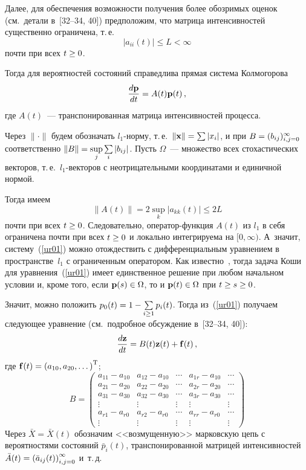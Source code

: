 \begin{multicols}{2}
Далее, для обеспечения возможности получения более обозримых оценок
(см.\ детали в~[32--34, 40]) предположим, что матрица интенсивностей
существенно ограничена, т.\,е.\
\begin{equation}
|a_{ii}(t)| \le L < \infty
\label{0102-1}
\end{equation}
\noindent почти при всех $t \hm\ge 0$.


Тогда для вероятностей состояний справедлива прямая система Колмогорова
\begin{equation} \label{ur01}
\displaystyle\frac{\displaystyle d{\mathbf p}\mathstrut}{\displaystyle dt\mathstrut}=A(t){\mathbf p}(t)\,,
\end{equation}
\noindent где $A(t)$~--- транспонированная матрица интенсивностей процесса.

Через $\|\cdot\|$  будем обозначать  $l_1$-нор\-му, т.\,е.\  $\|{\vx}\|\hm=\sum|x_i|$, и при
$B \hm= (b_{ij})_{i,j=0}^{\infty}$ соответственно $\|B\| \hm= \sup\limits_j \sum\limits_i |b_{ij}|$.
Пусть $\Omega$~--- множество всех стохастических векторов, т.\,е.\ $l_1$-век\-то\-ров с
неотрицательными координатами и единичной нормой.

Тогда имеем
$$\|A(t)\| = 2\sup_{k}\left|a_{kk}(t)\right| \le 2 L $$
почти при всех  $t \hm\ge 0$. Следовательно, опе\-ра\-тор-функ\-ция $A(t)$ из
$l_1$ в себя ограничена почти при всех $t \hm\ge 0$ и локально интегрируема на  $[0,\infty)$.
А~значит, сис\-те\-му~(\ref{ur01}) можно отождествить с дифференциальным уравнением
в пространстве~$l_1$ с ограниченным оператором. Как известно~\cite{DK}, тогда
задача Коши для уравнения~(\ref{ur01}) имеет единственное решение при любом начальном условии
и, кроме того, если   $\vp(s)\hm \in \Omega$, то и $\vp(t) \hm\in \Omega$ при $t \hm\ge s\hm \ge 0$.

Значит, можно положить  $p_0(t) \hm= 1\hm - \sum\limits_{i \ge 1} p_i(t)$. Тогда
из~(\ref{ur01}) получаем следующее уравнение (см.\ подробное
обсуждение в~[32--34, 40]):
\begin{equation}
\displaystyle\frac{\displaystyle d{\mathbf z}\mathstrut}{\displaystyle dt\mathstrut}= B(t){\mathbf z}(t)+{\mathbf f}(t)\,, \label{2.06}
\end{equation}
где ${\mathbf f}(t)=\left(a_{10}, a_{20},\dots \right)^{\mathrm{T}}$;
{ %
\begin{equation}
B = \begin{pmatrix}
a_{11}- a_{10}   & a_{12} - a_{10}   &  \cdots & a_{1r} - a_{10}  &\cdots \\
a_{21} - a_{20} & a_{22} - a_{20}   &    \cdots & a_{2r} - a_{20} &\cdots \\
a_{31} - a_{30}    & a_{32} - a_{30}  &    \cdots & a_{3r} - a_{30}  &\cdots \\
\vdots &\vdots &\vdots &\vdots &\vdots\\
a_{r1} - a_{r0}  & a_{r2} - a_{r0} & \cdots     &  a_{rr} -a_{r0} &\cdots \\
\vdots &\vdots &\vdots &\vdots &\vdots
\end{pmatrix}
\label{2.07}
\end{equation}
}
Через  $\bar{X}=\bar{X}(t)$ обозначим <<возмущенную>> марковскую цепь с вероятностями
со\-сто\-яний
$\bar{p}_i(t)$, транспонированной матрицей интенсивностей
$\bar{A}(t) \hm= \left(\bar{a}_{ij}(t)\right)_{i,j=0}^{\infty}$ и~т.\,д.


\end{multicols}
